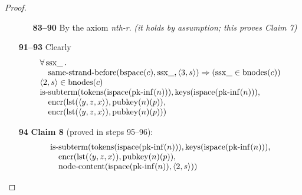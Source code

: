 \documentclass[11pt]{article}
\theoremstyle{plain}
\begin{document}
\begin{proof}
\begin{itemize}[leftmargin=2.8em, itemsep=4pt, parsep=1pt]
\begin{itemize}[leftmargin=2.8em, itemsep=4pt, parsep=1pt]
  \item[\textbf{83--90}] By the axiom \emph{nth-r}.  \emph{(it holds by assumption; this proves Claim 7)}
  \end{itemize}
  \item[\textbf{91--93}] Clearly
\begin{equation*}
\begin{array}{@{}l@{}}
\begin{array}{@{}l@{}} \forall \operatorname{ssx\_}. \\ \quad \operatorname{same\text{-}strand\text{-}before}(\operatorname{bspace}(c), \operatorname{ssx\_}, \langle 3, s \rangle) \Rightarrow (\operatorname{ssx\_} \in \operatorname{bnodes}(c)) \end{array} \\
\langle 2, s \rangle \in \operatorname{bnodes}(c) \\
\begin{array}{@{}l@{}} \operatorname{is\text{-}subterm}(\operatorname{tokens}(\operatorname{ispace}(\operatorname{pk\text{-}inf}(n))), \operatorname{keys}(\operatorname{ispace}(\operatorname{pk\text{-}inf}(n))), \\ \quad \operatorname{encr}(\operatorname{lst}(\langle y, z, x \rangle), \operatorname{pubkey}(n)(p)), \\ \quad \operatorname{encr}(\operatorname{lst}(\langle y, z, x \rangle), \operatorname{pubkey}(n)(p))) \end{array}
\end{array}
\end{equation*}

  \item[\textbf{94}] \textbf{Claim 8} (proved in steps 95--96):
\begin{equation*}
\begin{array}{@{}l@{}} \operatorname{is\text{-}subterm}(\operatorname{tokens}(\operatorname{ispace}(\operatorname{pk\text{-}inf}(n))), \operatorname{keys}(\operatorname{ispace}(\operatorname{pk\text{-}inf}(n))), \\ \quad \operatorname{encr}(\operatorname{lst}(\langle y, z, x \rangle), \operatorname{pubkey}(n)(p)), \\ \quad \operatorname{node\text{-}content}(\operatorname{ispace}(\operatorname{pk\text{-}inf}(n)), \langle 2, s \rangle)) \end{array}
\end{equation*}


\end{itemize}
\end{proof}
\end{document}
